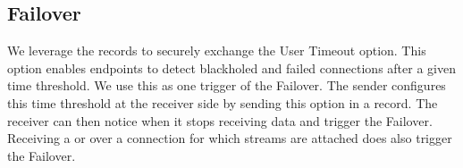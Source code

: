%
%




\subsection{Failover}
\label{sec:prot-migration}

We leverage the \tcpls records to securely exchange the \tcp User Timeout option. This option enables endpoints to detect blackholed and failed \tcp connections after a given time threshold. We use this as one trigger of the Failover. The sender configures this time threshold at the receiver side by sending this \tcp option in a \tcpls record. The receiver can then notice when it stops receiving data and trigger the Failover. Receiving a \tcp \rst or \fin over a \tcp connection for which \tcpls streams are attached does also trigger the Failover.

